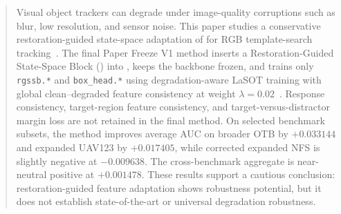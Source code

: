 \begin{abstract}
Visual object trackers can degrade under image-quality corruptions such as blur, low resolution, and sensor noise. This paper studies a conservative restoration-guided state-space adaptation of \baseline{} for RGB template-search tracking~\cite{ye2022ostrack}. The final Paper Freeze V1 method inserts a Restoration-Guided State-Space Block (\method{}) into \baseline{}, keeps the backbone frozen, and trains only \texttt{rgssb.*} and \texttt{box\_head.*} using degradation-aware LaSOT training with global clean--degraded feature consistency at weight $\lambda=0.02$~\cite{fan2019lasot}. Response consistency, target-region feature consistency, and target-versus-distractor margin loss are not retained in the final method. On selected benchmark subsets, the method improves average AUC on broader OTB by $+0.033144$ and expanded UAV123 by $+0.017405$, while corrected expanded NFS is slightly negative at $-0.009638$. The cross-benchmark aggregate is near-neutral positive at $+0.001478$. These results support a cautious conclusion: restoration-guided feature adaptation shows robustness potential, but it does not establish state-of-the-art or universal degradation robustness.
\end{abstract}
